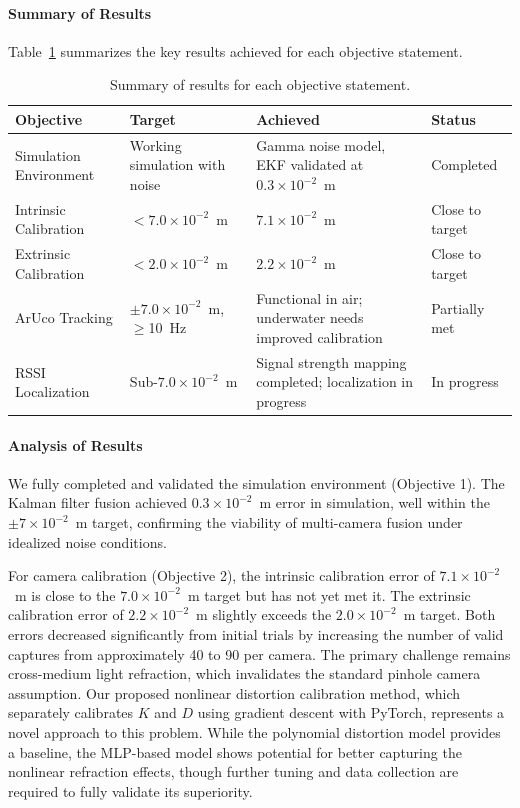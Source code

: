 \documentclass[11pt]{article}
\begin{document}
        \paragraph{Summary of Results}
        Table~\ref{tab:results_summary} summarizes the key results achieved for each objective statement.

        \begin{table}[H]
        \centering
        \caption{Summary of results for each objective statement.}
        \label{tab:results_summary}
        \begin{tabular}{|p{4cm}|p{3.5cm}|p{3.5cm}|p{3cm}|}
        \hline
        \textbf{Objective} & \textbf{Target} & \textbf{Achieved} & \textbf{Status} \\
        \hline
        Simulation Environment & Working simulation with noise & Gamma noise model, EKF validated at $0.3\times10^{-2}$~m & Completed \\
        \hline
        Intrinsic Calibration & $<7.0\times10^{-2}$~m & $7.1\times10^{-2}$~m & Close to target \\
        \hline
        Extrinsic Calibration & $<2.0\times10^{-2}$~m & $2.2\times10^{-2}$~m & Close to target \\
        \hline
        ArUco Tracking & $\pm7.0\times10^{-2}$~m, $\geq$10~Hz & Functional in air; underwater needs improved calibration & Partially met \\
        \hline
        RSSI Localization & Sub-$7.0\times10^{-2}$~m & Signal strength mapping completed; localization in progress & In progress \\
        \hline
        \end{tabular}
        \end{table}

        \paragraph{Analysis of Results}
        We fully completed and validated the simulation environment (Objective 1). The Kalman filter fusion achieved $0.3\times10^{-2}$~m error in simulation, well within the $\pm7\times10^{-2}$~m target, confirming the viability of multi-camera fusion under idealized noise conditions.

        For camera calibration (Objective 2), the intrinsic calibration error of $7.1\times10^{-2}$~m is close to the $7.0\times10^{-2}$~m target but has not yet met it. The extrinsic calibration error of $2.2\times10^{-2}$~m slightly exceeds the $2.0\times10^{-2}$~m target. Both errors decreased significantly from initial trials by increasing the number of valid captures from approximately 40 to 90 per camera. The primary challenge remains cross-medium light refraction, which invalidates the standard pinhole camera assumption. Our proposed nonlinear distortion calibration method, which separately calibrates $K$ and $D$ using gradient descent with PyTorch, represents a novel approach to this problem. While the polynomial distortion model provides a baseline, the MLP-based model shows potential for better capturing the nonlinear refraction effects, though further tuning and data collection are required to fully validate its superiority.
\end{document}
